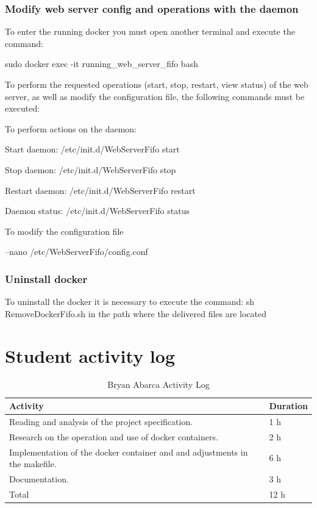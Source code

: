 \documentclass{article}
\begin{document}
\subsubsection{Modify web server config and operations with the daemon}
To enter the running docker you must open another terminal and execute the command:\\
\centerline{sudo docker exec -it running\_web\_server\_fifo bash}

To perform the requested operations (start, stop, restart, view status) of the web server, as well as modify the configuration file, the following commands must be executed:

To perform actions on the daemon:\\
\centerline{Start daemon: /etc/init.d/WebServerFifo start}
\centerline{Stop daemon: /etc/init.d/WebServerFifo stop}
\centerline{Restart daemon: /etc/init.d/WebServerFifo restart}
\centerline{Daemon status: /etc/init.d/WebServerFifo status}

To modify the configuration file\\
\centerline{--nano /etc/WebServerFifo/config.conf}
\subsubsection{Uninstall docker}
To uninstall the docker it is necessary to execute the command: sh RemoveDockerFifo.sh in the path where the delivered files are located

\section{Student activity log}

\begin{table}[H]
\centering
\caption{Bryan Abarca Activity Log}
\begin{tabular}{|p{7cm}|p{7cm}|}
\hline
\textbf{Activity} & \textbf{Duration} \\ \hline
Reading and analysis of the project specification. & 1 h \\ \hline
Research on the operation and use of docker containers. & 2 h\\ \hline
Implementation of the docker container and and adjustments in the makefile. & 6 h\\ \hline
Documentation. & 3 h\\ \hline
Total & 12 h\\ \hline
\end{tabular}
\end{table}
\end{document}
